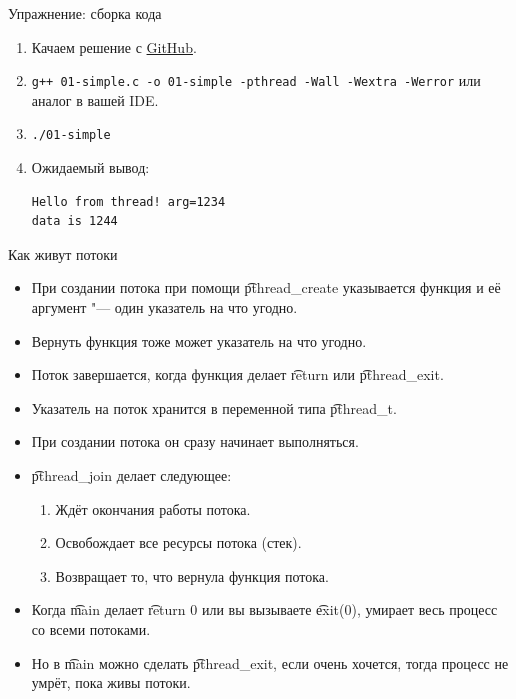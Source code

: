 \begin{frame}[fragile]{Упражнение: сборка кода}
	\begin{enumerate}
		\item Качаем решение с \href{https://raw.githubusercontent.com/yeputons/spring-2019-paradigms/master/190410/sources/01-simple.cpp}{GitHub}.
		\item \texttt{g++ 01-simple.c -o 01-simple -pthread -Wall -Wextra -Werror} или аналог в вашей IDE.
		\item \texttt{./01-simple}
		\item Ожидаемый вывод:
\begin{verbatim}
Hello from thread! arg=1234
data is 1244
\end{verbatim}
	\end{enumerate}
\end{frame}

\begin{frame}{Как живут потоки}
	\begin{itemize}
		\item При создании потока при помощи \t{pthread\_create} указывается функция и её аргумент "--- один указатель на что угодно.
		\item Вернуть функция тоже может указатель на что угодно.
		\item Поток завершается, когда функция делает \t{return} или \t{pthread\_exit}.
		\item Указатель на поток хранится в переменной типа \t{pthread\_t}.
		\item При создании потока он сразу начинает выполняться.
		\item \t{pthread\_join} делает следующее:
			\begin{enumerate}
				\item Ждёт окончания работы потока.
				\item Освобождает все ресурсы потока (стек).
				\item Возвращает то, что вернула функция потока.
			\end{enumerate}
		\item Когда \t{main} делает \t{return 0} или вы вызываете \t{exit(0)}, умирает весь процесс со всеми потоками.
		\item Но в \t{main} можно сделать \t{pthread\_exit}, если очень хочется, тогда процесс не умрёт, пока живы потоки.
	\end{itemize}
\end{frame}


